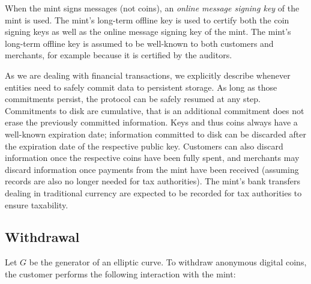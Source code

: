 \documentclass{llncs}
\begin{document}
When the mint signs messages (not coins), an {\em online message
  signing key} of the mint is used.  The mint's long-term offline key
is used to certify both the coin signing keys as well as the online
message signing key of the mint.  The mint's long-term offline key is
assumed to be well-known to both customers and merchants, for example
because it is certified by the auditors.

As we are dealing with financial transactions, we explicitly describe
whenever entities need to safely commit data to persistent storage.
As long as those commitments persist, the protocol can be safely
resumed at any step.  Commitments to disk are cumulative, that is an
additional commitment does not erase the previously committed
information.  Keys and thus coins always have a well-known expiration
date; information committed to disk can be discarded after the
expiration date of the respective public key.  Customers can also
discard information once the respective coins have been fully spent,
and merchants may discard information once payments from the mint have
been received (assuming records are also no longer needed for tax
authorities).  The mint's bank transfers dealing in traditional
currency are expected to be recorded for tax authorities to ensure
taxability.

\subsection{Withdrawal}

Let $G$ be the generator of an elliptic curve.  To withdraw anonymous
digital coins, the customer performs the following interaction with
the mint:
\end{document}
